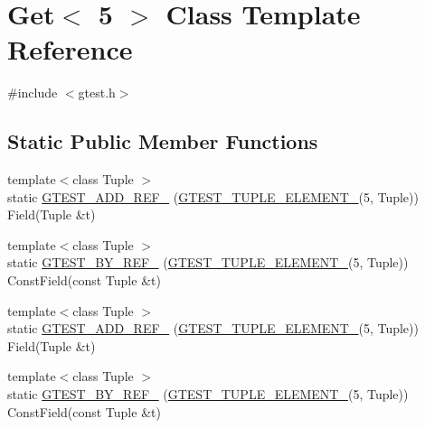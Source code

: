 \hypertarget{classstd_1_1tr1_1_1gtest__internal_1_1Get_3_015_01_4}{\section{\-Get$<$ 5 $>$ \-Class \-Template \-Reference}
\label{df/d93/classstd_1_1tr1_1_1gtest__internal_1_1Get_3_015_01_4}
}


{\ttfamily \#include $<$gtest.\-h$>$}

\subsection*{\-Static \-Public \-Member \-Functions}
\begin{DoxyCompactItemize}
\item 
{\footnotesize template$<$class Tuple $>$ }\\static \hyperlink{classstd_1_1tr1_1_1gtest__internal_1_1Get_3_015_01_4_a967bd830e931da5bb775247f64624f31}{\-G\-T\-E\-S\-T\-\_\-\-A\-D\-D\-\_\-\-R\-E\-F\-\_\-} (\hyperlink{gtest-tuple_8h_a1b7f133d8aa02e0b7afed7b66781eeb7}{\-G\-T\-E\-S\-T\-\_\-\-T\-U\-P\-L\-E\-\_\-\-E\-L\-E\-M\-E\-N\-T\-\_\-}(5, \-Tuple)) \-Field(\-Tuple \&t)
\item 
{\footnotesize template$<$class Tuple $>$ }\\static \hyperlink{classstd_1_1tr1_1_1gtest__internal_1_1Get_3_015_01_4_af68fc479ebc57c3ddaeae7ce7e529c9b}{\-G\-T\-E\-S\-T\-\_\-\-B\-Y\-\_\-\-R\-E\-F\-\_\-} (\hyperlink{gtest-tuple_8h_a1b7f133d8aa02e0b7afed7b66781eeb7}{\-G\-T\-E\-S\-T\-\_\-\-T\-U\-P\-L\-E\-\_\-\-E\-L\-E\-M\-E\-N\-T\-\_\-}(5, \-Tuple)) \-Const\-Field(const \-Tuple \&t)
\item 
{\footnotesize template$<$class Tuple $>$ }\\static \hyperlink{classstd_1_1tr1_1_1gtest__internal_1_1Get_3_015_01_4_a967bd830e931da5bb775247f64624f31}{\-G\-T\-E\-S\-T\-\_\-\-A\-D\-D\-\_\-\-R\-E\-F\-\_\-} (\hyperlink{gtest-tuple_8h_a1b7f133d8aa02e0b7afed7b66781eeb7}{\-G\-T\-E\-S\-T\-\_\-\-T\-U\-P\-L\-E\-\_\-\-E\-L\-E\-M\-E\-N\-T\-\_\-}(5, \-Tuple)) \-Field(\-Tuple \&t)
\item 
{\footnotesize template$<$class Tuple $>$ }\\static \hyperlink{classstd_1_1tr1_1_1gtest__internal_1_1Get_3_015_01_4_af68fc479ebc57c3ddaeae7ce7e529c9b}{\-G\-T\-E\-S\-T\-\_\-\-B\-Y\-\_\-\-R\-E\-F\-\_\-} (\hyperlink{gtest-tuple_8h_a1b7f133d8aa02e0b7afed7b66781eeb7}{\-G\-T\-E\-S\-T\-\_\-\-T\-U\-P\-L\-E\-\_\-\-E\-L\-E\-M\-E\-N\-T\-\_\-}(5, \-Tuple)) \-Const\-Field(const \-Tuple \&t)
\end{DoxyCompactItemize}


